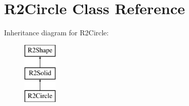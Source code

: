 \hypertarget{class_r2_circle}{}\section{R2\+Circle Class Reference}
\label{class_r2_circle}
Inheritance diagram for R2\+Circle\+:\begin{figure}[H]
\begin{center}
\leavevmode
\includegraphics[height=3.000000cm]{class_r2_circle}
\end{center}
\end{figure}
